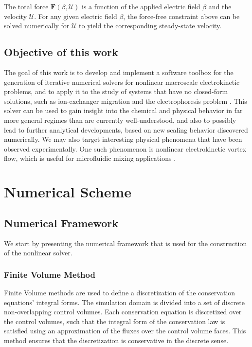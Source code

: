 \documentclass[MSc,beforeExam]{iitcsthesis}
\newcommand\bF{\boldsymbol{F}}
\newcommand\cU{\mathscr{U}}
\begin{document}
The total force $\bF(\beta, \cU)$ is a function of the applied electric field $\beta$ and
the velocity $\cU$.
For any given electric field $\beta$, the force-free constraint above 
can be solved numerically for $\cU$ to yield the corresponding steady-state velocity.

\section{Objective of this work}

The goal of this work is to develop and implement a software toolbox 
for the generation of iterative numerical solvers for nonlinear macroscale 
electrokinetic problems, and to apply it to the study
of systems that have no closed-form solutions, 
such as ion-exchanger migration \cite{yariv2010migration} 
and the electrophoresis problem \cite{schnitzer2012surface}.
This solver can be used to gain insight into the chemical 
and physical behavior in far more general regimes than 
are currently well-understood, 
and also to possibly lead to further analytical developments, 
based on new scaling behavior
discovered numerically. 
We may also target interesting physical
phenomena that have been observed experimentally.
One such phenomenon is nonlinear electrokinetic vortex flow, 
which is useful for microfluidic mixing applications 
\cite{wang2004mix, ben2002vortex}.


\chapter{Numerical Scheme} \label{ch:algorithm}

\section{Numerical Framework}

We start by presenting the numerical framework
that is used for the construction of the nonlinear solver.

\subsection{Finite Volume Method}

Finite Volume methods \cite{ferziger2002computational} 
are used to define a discretization of the conservation equations' integral forms.
The simulation domain is divided into a set of discrete non-overlapping control volumes.
Each conservation equation is discretized over the control volumes,
such that the integral form of the conservation law is satisfied using an approximation of the fluxes
over the control volume faces.
This method ensures that the discretization is conservative in the discrete sense.
\end{document}
